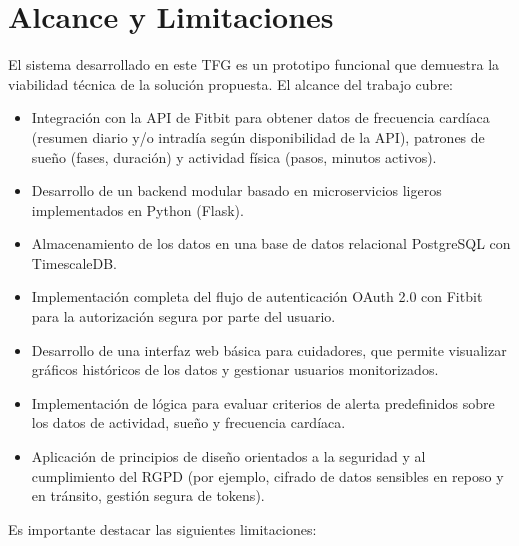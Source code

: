 \section{Alcance y Limitaciones}
\label{sec:intro_alcance}

El sistema desarrollado en este TFG es un prototipo funcional que demuestra la viabilidad técnica de la solución propuesta. El alcance del trabajo cubre:

\begin{itemize}
    \item Integración con la API de Fitbit\textsuperscript{\textregistered} para obtener datos de frecuencia cardíaca (resumen diario y/o intradía según disponibilidad de la API), patrones de sueño (fases, duración) y actividad física (pasos, minutos activos).
    \item Desarrollo de un backend modular basado en microservicios ligeros implementados en Python (Flask).
    \item Almacenamiento de los datos en una base de datos relacional PostgreSQL con TimescaleDB.
    \item Implementación completa del flujo de autenticación OAuth 2.0 con Fitbit\textsuperscript{\textregistered} para la autorización segura por parte del usuario.
    \item Desarrollo de una interfaz web básica para cuidadores, que permite visualizar gráficos históricos de los datos y gestionar usuarios monitorizados.
    \item Implementación de lógica para evaluar criterios de alerta predefinidos sobre los datos de actividad, sueño y frecuencia cardíaca.
    \item Aplicación de principios de diseño orientados a la seguridad y al cumplimiento del RGPD (por ejemplo, cifrado de datos sensibles en reposo y en tránsito, gestión segura de tokens).
\end{itemize}

Es importante destacar las siguientes limitaciones:

